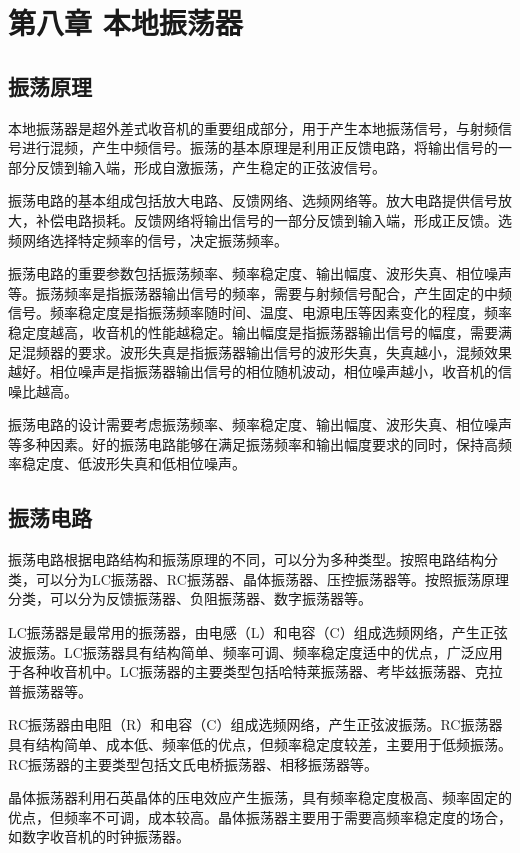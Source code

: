 \documentclass[12pt,UTF8]{ctexbook}
\begin{document}
\chapter{第八章 本地振荡器}

\section{振荡原理}

本地振荡器是超外差式收音机的重要组成部分，用于产生本地振荡信号，与射频信号进行混频，产生中频信号。振荡的基本原理是利用正反馈电路，将输出信号的一部分反馈到输入端，形成自激振荡，产生稳定的正弦波信号。

振荡电路的基本组成包括放大电路、反馈网络、选频网络等。放大电路提供信号放大，补偿电路损耗。反馈网络将输出信号的一部分反馈到输入端，形成正反馈。选频网络选择特定频率的信号，决定振荡频率。

振荡电路的重要参数包括振荡频率、频率稳定度、输出幅度、波形失真、相位噪声等。振荡频率是指振荡器输出信号的频率，需要与射频信号配合，产生固定的中频信号。频率稳定度是指振荡频率随时间、温度、电源电压等因素变化的程度，频率稳定度越高，收音机的性能越稳定。输出幅度是指振荡器输出信号的幅度，需要满足混频器的要求。波形失真是指振荡器输出信号的波形失真，失真越小，混频效果越好。相位噪声是指振荡器输出信号的相位随机波动，相位噪声越小，收音机的信噪比越高。

振荡电路的设计需要考虑振荡频率、频率稳定度、输出幅度、波形失真、相位噪声等多种因素。好的振荡电路能够在满足振荡频率和输出幅度要求的同时，保持高频率稳定度、低波形失真和低相位噪声。

\section{振荡电路}

振荡电路根据电路结构和振荡原理的不同，可以分为多种类型。按照电路结构分类，可以分为LC振荡器、RC振荡器、晶体振荡器、压控振荡器等。按照振荡原理分类，可以分为反馈振荡器、负阻振荡器、数字振荡器等。

LC振荡器是最常用的振荡器，由电感（L）和电容（C）组成选频网络，产生正弦波振荡。LC振荡器具有结构简单、频率可调、频率稳定度适中的优点，广泛应用于各种收音机中。LC振荡器的主要类型包括哈特莱振荡器、考毕兹振荡器、克拉普振荡器等。

RC振荡器由电阻（R）和电容（C）组成选频网络，产生正弦波振荡。RC振荡器具有结构简单、成本低、频率低的优点，但频率稳定度较差，主要用于低频振荡。RC振荡器的主要类型包括文氏电桥振荡器、相移振荡器等。

晶体振荡器利用石英晶体的压电效应产生振荡，具有频率稳定度极高、频率固定的优点，但频率不可调，成本较高。晶体振荡器主要用于需要高频率稳定度的场合，如数字收音机的时钟振荡器。
\end{document}
